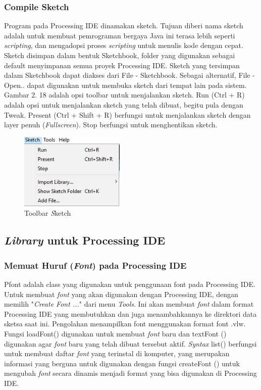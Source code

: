 \subsubsection{ Compile Sketch }
Program pada Processing IDE dinamakan sketch. Tujuan diberi nama sketch adalah untuk membuat pemrograman bergaya Java ini terasa lebih seperti \textit{scripting}, dan mengadopsi proses \textit{scripting} untuk menulis kode dengan cepat. Sketch disimpan dalam bentuk Sketchbook, folder yang digunakan sebagai default menyimpanan semua proyek Processing IDE. Sketch yang tersimpan dalam Sketchbook dapat diakses dari File - Sketchbook. Sebagai alternatif, File - Open.. dapat digunakan untuk membuka sketch dari tempat lain pada sistem. Gambar 2. 18 adalah opsi toolbar untuk menjalankan sketch. Run (Ctrl + R) adalah opsi untuk menjalankan sketch yang telah dibuat, begitu pula dengan Tweak. Present (Ctrl + Shift + R) berfungsi untuk menjalankan sketch dengan layer penuh (\textit{Fullscreen}). Stop berfungsi untuk menghentikan sketch. 

	\begin{figure}[H]
	\centering
	\includegraphics[width=5cm]{gambar/compile.jpg}
	\caption{Toolbar \emph Sketch}
\end{figure}

\subsection{ \textit{Library} untuk Processing IDE }
\subsubsection{ Memuat Huruf (\textit{Font}) pada Processing IDE }
Pfont adalah class yang digunakan untuk penggunaan font pada Processing IDE. Untuk membuat \textit{font} yang akan digunakan dengan Processing IDE, dengan memilih "\textit{Create Font ...}" dari menu \textit{Tools}. Ini akan membuat \textit{font} dalam format Processing IDE yang membutuhkan dan juga menambahkannya ke direktori data sketsa saat ini. Pengolahan menampilkan font menggunakan format font .vlw. Fungsi loadFont() digunakan untuk membuat \textit{font} baru dan textFont () digunakan agar \textit{font} baru yang telah dibuat tersebut aktif. \textit{Syntax} list() berfungsi untuk membuat daftar \textit{font} yang terinstal di komputer, yang merupakan informasi yang berguna untuk digunakan dengan fungsi createFont () untuk mengubah \textit{font} secara dinamis menjadi format yang bisa digunakan di Processing IDE. 


